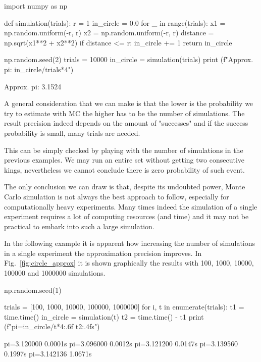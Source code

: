 \begin{ipython}
import numpy as np

def simulation(trials):
  r = 1
  in_circle = 0.0
  for _ in range(trials):
      x1 = np.random.uniform(-r, r)
      x2 = np.random.uniform(-r, r)
      distance = np.sqrt(x1**2 + x2**2)
      if distance <= r:
          in_circle += 1
  return in_circle 

np.random.seed(2)
trials = 10000
in_circle = simulation(trials)
print (f"Approx. pi: {in_circle/trials*4}")  
\end{ipython}
\begin{ioutput}
Approx. pi: 3.1524
\end{ioutput}

A general consideration that we can make is that the lower is the probability we try to estimate with MC the higher has to be the number of simulations. 
The result precision indeed depends on the amount of "successes" and if the success probability is small, many trials are needed. 

This can be simply checked by playing with the number of simulations in the previous examples. We may run an entire set without getting two consecutive kings, nevertheless we cannot conclude there is zero probability of such event.

The only conclusion we can draw is that, despite its undoubted power, Monte Carlo simulation is not always the best approach to follow, especially for computationally heavy experiments. Many times indeed the simulation of a single experiment requires a lot of computing resources (and time) and it may not be practical to embark into such a large simulation.

In the following example it is apparent how increasing the number of simulations in a single experiment the approximation precision improves. In Fig.~\ref{fig:circle_approx} it is shown graphically the results with 100, 1000, 10000, 100000 and 1000000 simulations.

\begin{ipython}
np.random.seed(1)
  
trials = [100, 1000, 10000, 100000, 1000000]
for i, t in enumerate(trials):
    t1 = time.time()
    in_circle = simulation(t)
    t2 = time.time() - t1
    print (f"pi={in_circle/t*4:.6f} {t2:.4f}s")
\end{ipython}
\begin{ioutput}
pi=3.120000 0.0001s
pi=3.096000 0.0012s
pi=3.121200 0.0147s
pi=3.139560 0.1997s
pi=3.142136 1.0671s
\end{ioutput}

